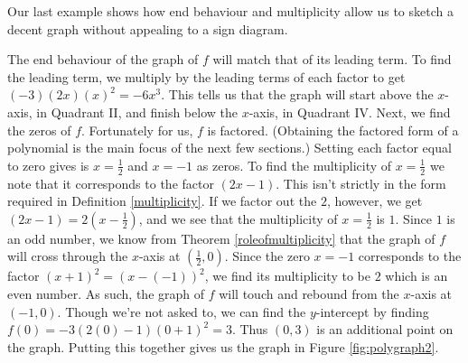 \medskip

Our last example shows how end behaviour and multiplicity allow us to sketch a decent graph without appealing to a sign diagram.


\medskip

{
The end behaviour of the graph of $f$ will match that of its leading term.  To find the leading term, we multiply by the leading terms of each factor to get $(-3)(2x)(x)^2 = -6x^3$.  This tells us that the graph will start above the $x$-axis, in Quadrant II, and finish below the $x$-axis, in Quadrant IV.  Next, we find the zeros of $f$.  Fortunately for us, $f$ is factored. (Obtaining the factored form of a polynomial is the main focus of the next few sections.)  Setting each factor equal to zero gives is $x = \frac{1}{2}$ and $x=-1$ as zeros. To find the multiplicity of $x=\frac{1}{2}$ we note that it corresponds to the factor $(2x-1)$.  This isn't strictly in the form required in Definition \ref{multiplicity}.  If we factor out the $2$, however, we get $(2x-1) = 2\left(x-\frac{1}{2}\right)$, and we see that the multiplicity of $x = \frac{1}{2}$ is $1$.  Since $1$ is an odd number, we know from Theorem \ref{roleofmultiplicity} that the graph of $f$ will cross through the $x$-axis at $\left(\frac{1}{2},0\right)$.   Since the zero $x=-1$ corresponds to the factor $(x+1)^2 = (x-(-1))^2$, we find its multiplicity to be $2$ which is an even number.  As such, the graph of $f$ will touch and rebound from the $x$-axis at $(-1,0)$.  Though we're not asked to, we can find the $y$-intercept by finding $f(0) = -3(2(0)-1)(0+1)^2 = 3$.  Thus  $(0,3)$ is an additional point on the graph.  Putting this together gives us the graph in Figure \ref{fig:polygraph2}.

}

